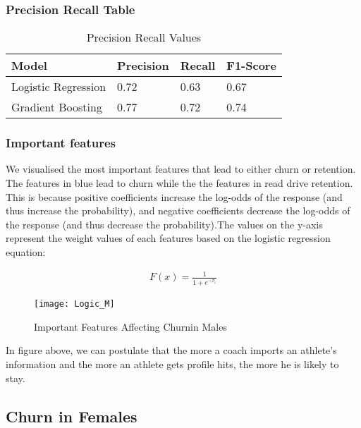 \documentclass[
10pt, %
a4paper, %
oneside, %
headinclude,footinclude, %
BCOR5mm, %
]{scrartcl}
\begin{document}
\subsubsection{Precision Recall Table}

\begin{table}[H]
\centering
\caption{Precision Recall Values}
\label{my-label}
\begin{tabular}{@{}llll@{}}
\toprule
Model               & Precision & Recall & F1-Score \\ \midrule
Logistic Regression & 0.72      & 0.63   & 0.67     \\
Gradient Boosting   & 0.77      & 0.72   & 0.74     \\  \bottomrule
\end{tabular}
\end{table}

\subsubsection{Important features}
We visualised the most important features that lead to either churn or retention. The features in blue lead to churn while the the features in read drive retention.  This is because positive coefficients increase the log-odds of the response (and thus increase the probability), and negative coefficients decrease the log-odds of the response (and thus decrease the probability).The values on the y-axis represent the weight values of each features based on the logistic regression equation:

\begin{align*}
  F(x) = \frac{1}{1+e^{-\beta_i}}
\end{align*}

\begin{figure}[H]
\centering 
\texttt{[image: Logic\_M]} 
\caption[Lostic Regression Confusion Matrix]{Important Features Affecting Churnin Males} %
\label{fig:gallery} 
\end{figure}
In figure above, we can postulate that the more a coach imports an athlete's information and the more an athlete gets profile hits, the more he is likely to stay.

\subsection{Churn in Females}
\end{document}

